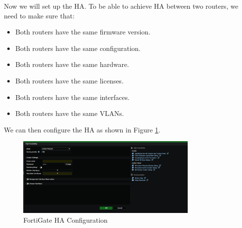\documentclass[12pt]{report}
\begin{document}
Now we will set up the HA. To be able to achieve HA between two routers, we need to make sure that:
\begin{itemize}
    \item Both routers have the same firmware version.
    \item Both routers have the same configuration.
    \item Both routers have the same hardware.
    \item Both routers have the same licenses.
    \item Both routers have the same interfaces.
    \item Both routers have the same VLANs.

\end{itemize}
We can then configure the HA as shown in Figure \ref{fig:ha}.
\begin{figure}
    \centering
    \includegraphics[width=0.8\textwidth]{images/Implementation/haconfig.png}
    \caption{FortiGate HA Configuration}
    \label{fig:ha}
\end{figure}
\end{document}
